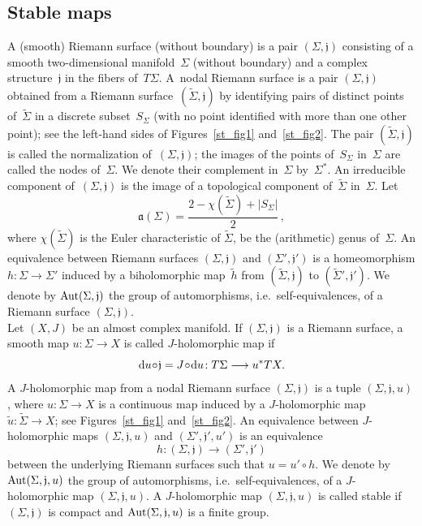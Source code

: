 \documentclass[11pt]{article}
\numberwithin{equation}{section}
\theoremstyle{definition}
\def\wt#1{\widetilde{#1}}
\def\sf#1{\textsf{#1}}
\def\lra{\longrightarrow}
\def\fa{\mathfrak a}
\def\fj{\mathfrak j}
\def\Si{\Sigma}
\def\Aut{\textnormal{Aut}}
\def\nd{\textnormal{d}}
\begin{document}
\subsection{Stable maps}
\label{StabMaps_subs}

\noindent
A (smooth) \sf{Riemann surface} (without boundary) is a pair $(\Si,\fj)$ consisting
of a smooth two-dimensional manifold~$\Si$ (without boundary) and 
a complex structure~$\fj$ in the fibers of~$T\Si$.
A~\sf{nodal Riemann surface} is a pair $(\Si,\fj)$ obtained from 
a Riemann surface~$(\wt\Si,\fj)$ by identifying pairs of 
distinct points of~$\wt\Si$ in a discrete subset~$S_{\Si}$
(with no point identified with more than one other point);
see the left-hand sides of Figures~\ref{st_fig1} and~\ref{st_fig2}.
The pair $(\wt\Si,\fj)$ is called the \sf{normalization} of~$(\Si,\fj)$;
the images of the points of~$S_{\Si}$ in~$\Si$ are called the \sf{nodes} of~$\Si$.
We denote their complement  in~$\Si$ by~$\Si^*$.
An \sf{irreducible component} of~$(\Si,\fj)$ is the image of 
a topological component of~$\wt\Si$ in~$\Si$.
Let
$$\fa(\Si)= \frac{2-\chi(\wt\Si)+|S_{\Si}|}{2}\,,$$
where $\chi(\wt\Si)$ is the Euler characteristic of $\wt\Si$, be the 
(\sf{arithmetic}) \sf{genus} of~$\Si$.
An \sf{equivalence} between Riemann surfaces $(\Si,\fj)$ and $(\Si',\fj')$
is a homeomorphism $h\!:\Si\!\lra\!\Si'$ induced by a biholomorphic map~$\wt{h}$
from $(\wt\Si,\fj)$ to $(\wt\Si',\fj')$.
We denote by $\Aut(\Si,\fj)$ the group of automorphisms, 
i.e.~self-equivalences, of a Riemann surface $(\Si,\fj)$.\\ 

\noindent
Let $(X,J)$ be an almost complex manifold.
If $(\Si,\fj)$ is a Riemann surface, a smooth map $u\!:\Si\!\lra\!X$
is called \sf{$J$-holomorphic map} if
$$\nd u\!\circ\!\fj=J\!\circ\!\nd u\!:T\Si\lra u^*TX.$$
A \sf{$J$-holomorphic map} from a nodal Riemann surface $(\Si,\fj)$ 
is a tuple
$(\Si,\fj,u)$, where $u\!:\Si\!\lra\!X$ is a continuous map induced by 
a $J$-holomorphic map $\wt{u}\!:\wt\Si\!\lra\!X$;
see Figures~\ref{st_fig1} and~\ref{st_fig2}.
An \sf{equivalence} between $J$-holomorphic maps $(\Si,\fj,u)$ and $(\Si',\fj',u')$
is an equivalence 
$$h\!: (\Si,\fj)\lra(\Si',\fj')$$
between the underlying Riemann surfaces such that $u\!=\!u'\!\circ\!h$.
We denote by $\Aut(\Si,\fj,u)$ the group of automorphisms, 
i.e.~self-equivalences, of a $J$-holomorphic map $(\Si,\fj,u)$.
A $J$-holomorphic map $(\Si,\fj,u)$ is called \sf{stable} if 
$(\Si,\fj)$ is compact and  $\Aut(\Si,\fj,u)$ is a finite group.\\
\end{document}
